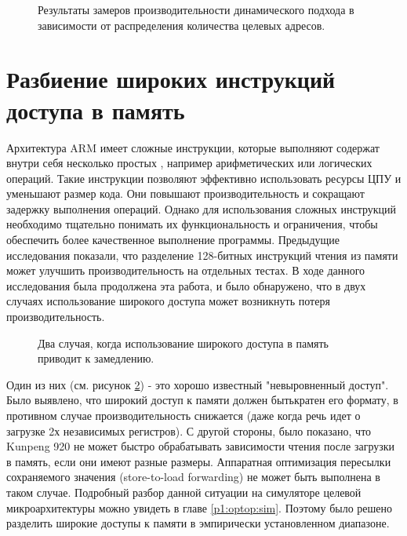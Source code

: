 \begin{figure}[ht]
	\caption{Результаты замеров производительности динамического подхода в зависимости от распределения количества целевых адресов.}\label{fig:ICP2}
\end{figure}


 \section {Разбиение широких инструкций доступа в память} \label{ch2:split_ldp_stp}
Архитектура ARM имеет сложные инструкции, которые выполняют содержат внутри себя несколько простых , например арифметических или логических операций. Такие инструкции позволяют эффективно использовать ресурсы ЦПУ и уменьшают размер кода. Они повышают производительность и сокращают задержку выполнения операций. Однако для использования сложных инструкций необходимо тщательно понимать их функциональность и ограничения, чтобы обеспечить более качественное выполнение программы. Предыдущие исследования \cite{park2019microarchitecture} показали, что разделение 128-битных инструкций чтения из памяти  может улучшить производительность на отдельных тестах. В ходе данного исследования была продолжена эта работа, и было обнаружено, что в двух случаях использование широкого доступа может возникнуть потеря производительность.

\begin{figure}[htbp]
	\centering
	
	\caption{Два случая, когда использование широкого доступа в память приводит к замедлению.}
	\label{splitsvg1}
\end{figure}

Один из них (см. рисунок \ref{splitsvg1}) - это хорошо известный "невыровненный доступ". Было выявлено, что широкий доступ к памяти должен бытькратен его формату, в противном случае производительность снижается (даже когда речь идет о загрузке 2х независимых регистров). С другой стороны, было показано, что Kunpeng 920 не может быстро обрабатывать зависимости чтения после загрузки в память, если они имеют разные размеры. Аппаратная оптимизация пересылки сохраняемого значения (store-to-load forwarding) \cite{shen2013modern} не может быть выполнена в таком случае. Подробный разбор данной ситуации на симуляторе целевой микроархитектуры можно увидеть в главе \ref{p1:optop:sim}. Поэтому было решено разделить широкие доступы к памяти в эмпирически установленном диапазоне.



